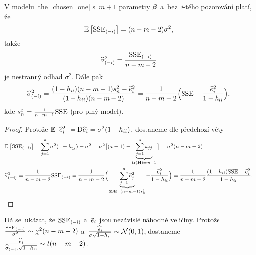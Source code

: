 \begin{dusl}
	V modelu \eqref{the_chosen_one} s~$m+1$ parametry $\boldsymbol{\beta}$ a~bez~$i$-tého pozorování platí, že $$ \mathbb{E}\left[ \mathrm{SSE}_{(-i)} \right] = (n-m-2)\sigma^2, $$
	takže
	 $$ \widehat{\sigma}^2_{(-i)} = \frac{\mathrm{SSE}_{(-i)}}{n-m-2} $$ je nestranný odhad $\sigma^2$. Dále pak
	 $$ \widehat{\sigma}^2_{(-i)} = \frac{(1-h_{ii})(n-m-1)s_n^2-\widehat{e}_i^2}{(1-h_{ii})(n-m-2)} = \frac{1}{n-m-2}\Big(\mathrm{SSE} -\frac{\widehat{e}_i^2}{1-h_{ii}}\Big), $$ kde $s_n^2 = \frac{1}{n-m-1}\mathrm{SSE}$ (pro plný model).
	\begin{proof}
		Protože $\mathbb{E}\left[ \widehat{e}_i^2 \right] = \mathrm{D} \widehat{e}_i = \sigma^2(1-h_{ii})$, dostaneme dle předchozí věty
		\[
		\begin{split}
		&\mathbb{E}\left[ \mathrm{SSE}_{(-i)} \right] = \sum\limits_{j=1}^{n}\sigma^2(1-h_{jj})-\sigma^2 = \sigma^2\big[(n-1)-\underbrace{\sum\limits_{j=1}^{n} h_{jj}}_{\mathrm{tr}(\textbf{H}) = m+1}\big] = \sigma^2(n-m-2)\\
		&\widehat{\sigma}^2_{(-i)} = \frac{1}{n-m-2}\mathrm{SSE}_{(-i)} = \frac{1}{n-m-2}\Big(\underbrace{\sum\limits_{j=1}^{n}\widehat{e}_j^2}_{\mathrm{SSE} = (n-m-1)s_n^2}-\frac{\widehat{e}_i^2}{1-h_{ii}}\Big) = \frac{1}{n-m-2}\frac{(1-h_{ii})\mathrm{SSE}-\widehat{e}_i^2}{1-h_{ii}}.
		\end{split}
		\]
	\end{proof}
\end{dusl}

\begin{remark}
	Dá se~ukázat, že $\mathrm{SSE}_{(-i)}$ a~$\widehat{e}_i$ jsou nezávislé náhodné veličiny. Protože $\frac{\mathrm{SSE}_{(-i)}}{\sigma^2}\sim\chi^2(n-m-2)$ a~$\frac{\widehat{e}_i}{\sigma\sqrt{1-h_{ii}}}\sim\mathcal{N}(0,1)$, dostaneme $\frac{\widehat{e}_i}{\widehat{\sigma}_{(-i)}\sqrt{1-h_{ii}}}\sim t(n-m-2)$.
\end{remark}


